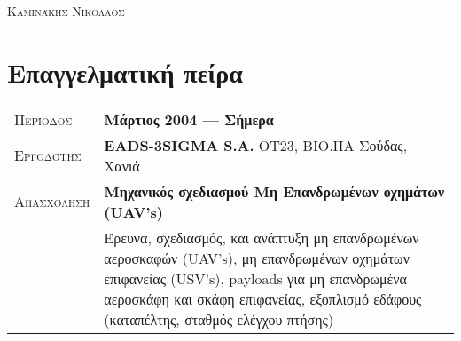 \documentclass[a4paper, oneside, final]{scrartcl} %
\newcommand{\gray}{\rowcolor[gray]{.90}} %
\begin{document}
\begin{center} %


{\fontsize{36}{36}\selectfont\scshape Καμινάκης Νίκολαος} %

\vspace{1.5cm} %


%


\section{Επαγγελματική πείρα}

\begin{tabularx}{0.97\linewidth}{>{\raggedleft\scshape}p{2cm}X}
\gray Περίοδος & \textbf{Μάρτιος 2004 --- Σήμερα}\\
\gray Εργοδότης & \textbf{EADS-3SIGMA S.A.} \hfill ΟΤ23, ΒΙΟ.ΠΑ Σούδας, Χανιά\\
\gray Απασχόληση & \textbf{Μηχανικός σχεδιασμού Μη Επανδρωμένων οχημάτων (UAV's)}\\
		& Έρευνα, σχεδιασμός, και ανάπτυξη μη επανδρωμένων αεροσκαφών (UAV's), μη επανδρωμένων οχημάτων επιφανείας (USV's),
		payloads για μη επανδρωμένα αεροσκάφη και σκάφη επιφανείας, εξοπλισμό εδάφους (καταπέλτης, σταθμός ελέγχου πτήσης)
		
\end{tabularx}


\end{center}
\end{document}
